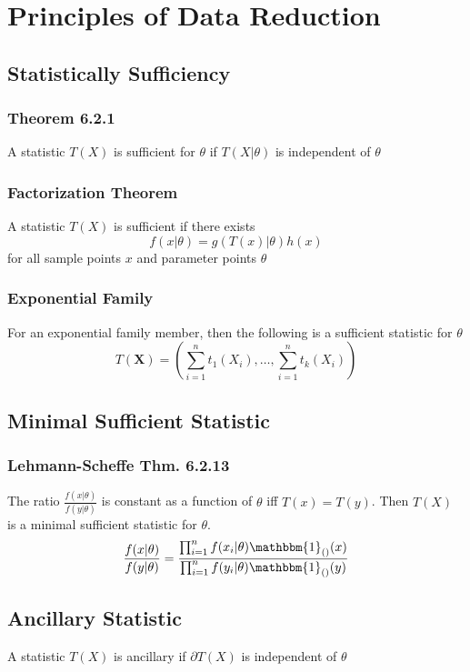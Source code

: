 \section{Principles of Data Reduction}
	\subsection{Statistically Sufficiency}
		\subsubsection*{Theorem 6.2.1}
			A statistic \(T(X)\) is sufficient for \(\theta\) if
			\(T(X|\theta)\) is independent of \(\theta\)
	
		\subsubsection*{Factorization Theorem}
			A statistic \(T(X)\) is sufficient if there exists
			\[ f(x|\theta) = g(T(x)|\theta)h(x) \]
			for all sample points \(x\)
			and parameter points \(\theta\)
		
		\subsubsection*{Exponential Family}
			For an exponential family member, then the following is a sufficient statistic for \(\theta\)
			\[T(\mathbf{X})=\left( \sum_{i=1}^n t_1(X_i),\ldots, \sum_{i=1}^n t_k(X_i) \right)\]
	
	\subsection{Minimal Sufficient Statistic}
		\subsubsection*{Lehmann-Scheffe Thm. 6.2.13}
			The ratio \(\frac{f(x|\theta)}{f(y|\theta)}\) is constant as a function of \(\theta\) iff \(T(x) = T(y)\). 
			Then \(T(X)\) is a minimal sufficient statistic for \(\theta\).
			\[\frac{f(x|\theta)}{f(y|\theta)} = \frac{\prod_{i=1}^nf(x_i|\theta)\mathbbm{1}_{()}(x)}{\prod_{i=1}^nf(y_i|\theta)\mathbbm{1}_{()}(y)}\]
	
	\subsection{Ancillary Statistic}
		A statistic \(T(X)\) is ancillary if
		\(\partial T(X)\) is independent of \(\theta\)
	
